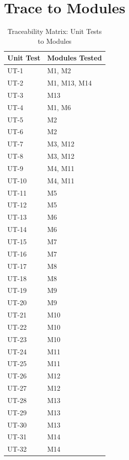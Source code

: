 \documentclass[12pt, titlepage]{article}
\begin{document}
\section{Trace to Modules}
\begin{table}[H]
\centering
\begin{tabular}{|l|l|}
\hline
\textbf{Unit Test} & \textbf{Modules Tested} \\ \hline
UT-1 & M1, M2 \\ \hline
UT-2 & M1, M13, M14 \\ \hline
UT-3 & M13 \\ \hline
UT-4 & M1, M6 \\ \hline
UT-5 & M2 \\ \hline
UT-6 & M2 \\ \hline
UT-7 & M3, M12 \\ \hline
UT-8 & M3, M12 \\ \hline
UT-9 & M4, M11 \\ \hline
UT-10 & M4, M11 \\ \hline
UT-11 & M5 \\ \hline
UT-12 & M5 \\ \hline
UT-13 & M6 \\ \hline
UT-14 & M6 \\ \hline
UT-15 & M7 \\ \hline
UT-16 & M7 \\ \hline
UT-17 & M8 \\ \hline
UT-18 & M8 \\ \hline
UT-19 & M9 \\ \hline
UT-20 & M9 \\ \hline
UT-21 & M10 \\ \hline
UT-22 & M10 \\ \hline
UT-23 & M10 \\ \hline
UT-24 & M11 \\ \hline
UT-25 & M11 \\ \hline
UT-26 & M12 \\ \hline
UT-27 & M12 \\ \hline
UT-28 & M13 \\ \hline
UT-29 & M13 \\ \hline
UT-30 & M13 \\ \hline
UT-31 & M14 \\ \hline
UT-32 & M14 \\ \hline
\end{tabular}
\caption{Traceability Matrix: Unit Tests to Modules \citep{SRS}}
\label{tab:traceability}
\end{table}
  
\end{document}
